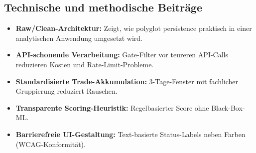 \subsection{Technische und methodische Beiträge}
\begin{itemize}
  \item \textbf{Raw/Clean-Architektur:} Zeigt, wie polyglot persistence praktisch in einer analytischen Anwendung umgesetzt wird. %
  \item \textbf{API-schonende Verarbeitung:} Gate-Filter vor teureren API-Calls reduzieren Kosten und Rate-Limit-Probleme. %
  \item \textbf{Standardisierte Trade-Akkumulation:} 3-Tage-Fenster mit fachlicher Gruppierung reduziert Rauschen. %
  \item \textbf{Transparente Scoring-Heuristik:} Regelbasierter Score ohne Black-Box-ML. %
  \item \textbf{Barrierefreie UI-Gestaltung:} Text-basierte Status-Labels neben Farben (WCAG-Konformität). %
\end{itemize}

